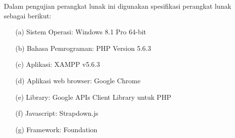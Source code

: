 Dalam pengujian perangkat lunak ini digunakan spesifikasi perangkat lunak sebagai berikut:

\begin{enumerate}
\item[(a)] Sistem Operasi: Windows 8.1 Pro 64-bit
\item[(b)] Bahasa Pemrograman: PHP Version 5.6.3
\item[(c)] Aplikasi: XAMPP v5.6.3
\item[(d)] Aplikasi web browser: Google Chrome
\item[(e)] Library: Google APIs Client Library untuk PHP
\item[(f)] Javascript: Strapdown.js
\item[(g)] Framework: Foundation
\end{enumerate}

